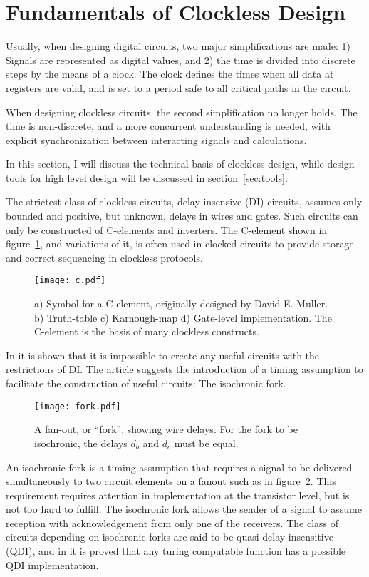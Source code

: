 \section{Fundamentals of Clockless Design}

Usually, when designing digital circuits, two major simplifications
are made: 1) Signals are represented as digital values, and 2) the
time is divided into discrete steps by the means of a clock. The clock
defines the times when all data at registers are valid, and is set to
a period safe to all critical paths in the circuit.

When designing clockless circuits, the second simplification no longer
holds. The time is non-discrete, and a more concurrent understanding
is needed, with explicit synchronization between interacting signals
and calculations.

In this section, I will discuss the technical basis of clockless
design, while design tools for high level design will be discussed in
section~\ref{sec:tools}.

The strictest class of clockless circuits, delay insensive
(DI) circuits, assumes only
bounded and positive, but unknown, delays in wires and gates. Such
circuits can only be constructed of C-elements and inverters. The
C-element shown in figure~\ref{fig:c}, and variations of it, is often
used in clocked circuits to provide storage and correct sequencing in
clockless protocols.

\begin{figure}[htbp]
  \centering
  \texttt{[image: c.pdf]}
  \caption{a) Symbol for a C-element, originally designed by David
    E. Muller. b) Truth-table c) Karnough-map d) Gate-level
    implementation. The C-element is the basis of many clockless
    constructs.}
  \label{fig:c}
\end{figure}

In \cite{dilimit} it is shown that it is impossible to create any
useful circuits with the restrictions of DI. The article suggests the
introduction of a timing assumption to facilitate the construction of
useful circuits: The isochronic fork.

\begin{figure}[htbp]
  \centering
  \texttt{[image: fork.pdf]}
  \caption{A fan-out, or ``fork'', showing wire delays. For the
    fork to be isochronic, the delays $d_b$ and $d_c$ must be equal.}
  \label{fig:fork}
\end{figure}

An isochronic fork is a timing assumption that requires a signal to be
delivered simultaneously to two circuit elements on a fanout such as
in figure~\ref{fig:fork}. This requirement requires attention in
implementation at the transistor level, but is not too hard to
fulfill. The isochronic fork allows the sender of a signal to assume
reception with acknowledgement from only one of the receivers. The
class of circuits depending on isochronic forks are said to be quasi
delay insensitive (QDI),
and in \cite{turing} it is proved that any turing computable function
has a possible QDI implementation.

